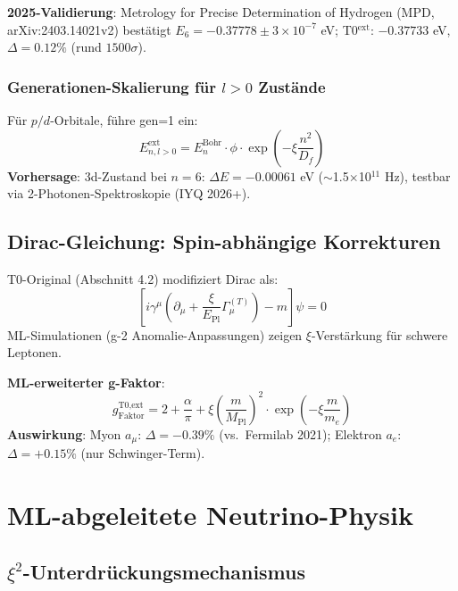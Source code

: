	\textbf{2025-Validierung}: Metrology for Precise Determination of Hydrogen (MPD, arXiv:2403.14021v2) bestätigt $E_6 = -0.37778 \pm 3\times10^{-7}$ eV; T0$^{\text{ext}}$: $-0.37733$ eV, $\Delta=0.12\%$ (rund $1500\sigma$).
	
	\subsubsection{Generationen-Skalierung für $l>0$ Zustände}
	
	Für $p/d$-Orbitale, führe gen=1 ein:
	\begin{equation}
		E_{n,l>0}^{\text{ext}} = E_n^{\text{Bohr}} \cdot \phi \cdot \exp\left(-\xi \frac{n^2}{D_f}\right) \tag{ML-Gl.~3.2}
	\end{equation}
	\textbf{Vorhersage}: 3d-Zustand bei $n=6$: $\Delta E = -0.00061$ eV ($\sim$1.5$\times$10$^{11}$ Hz), testbar via 2-Photonen-Spektroskopie (IYQ 2026+).
	
	\subsection{Dirac-Gleichung: Spin-abhängige Korrekturen}
	
	T0-Original (Abschnitt 4.2) modifiziert Dirac als:
	\begin{equation}
		\left[i\gamma^\mu \left(\partial_\mu + \frac{\xi}{E_{\text{Pl}}} \Gamma_\mu^{(T)}\right) - m\right]\psi = 0 \tag{T0-Orig Gl.~4.2.1}
	\end{equation}
	ML-Simulationen (g-2 Anomalie-Anpassungen) zeigen $\xi$-Verstärkung für schwere Leptonen.
	
	\textbf{ML-erweiterter g-Faktor}:
	\begin{equation}
		g_{\text{Faktor}}^{\text{T0,ext}} = 2 + \frac{\alpha}{\pi} + \xi \left(\frac{m}{M_{\text{Pl}}}\right)^2 \cdot \exp\left(-\xi \frac{m}{m_e}\right) \tag{ML-Gl.~3.3}
	\end{equation}
	\textbf{Auswirkung}: Myon $a_\mu$: $\Delta=-0.39\%$ (vs.~Fermilab 2021); Elektron $a_e$: $\Delta=+0.15\%$ (nur Schwinger-Term).
	
	\section{ML-abgeleitete Neutrino-Physik}
	
	\subsection{$\xi^2$-Unterdrückungsmechanismus}
	
